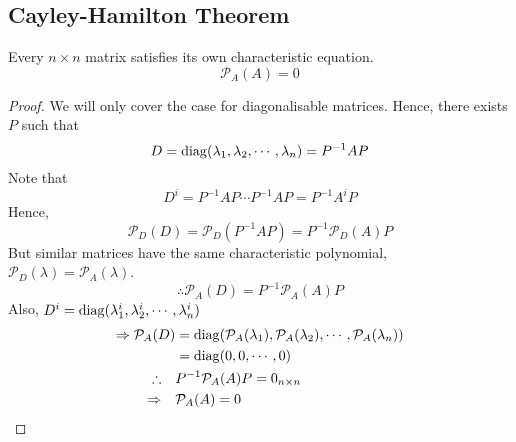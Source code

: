 \documentclass{article}
\numberwithin{equation}{section}
\begin{document}
\subsection{Cayley-Hamilton Theorem}
\begin{thm}
    Every $n \times n$ matrix satisfies its own characteristic equation.
    \begin{equation}\label{eq:5-20}
        \mathcal{P}_A(A) = 0
    \end{equation}
\end{thm}
\begin{proof}
    We will only cover the case for diagonalisable matrices. Hence, there exists $P$ such that
    \[
        D = \operatorname{diag}(\lambda_1, \lambda_2, \cdots, \lambda_n) = P^{-1}AP
    \]
    Note that
    \[
        D^i = P^{-1}AP \cdots P^{-1}AP = P^{-1}A^iP
    \]
    Hence,
    \[
        \mathcal{P}_D(D) = \mathcal{P}_D(P^{-1}AP) = P^{-1}\mathcal{P}_D(A)P  
    \]
    But similar matrices have the same characteristic polynomial, $\mathcal{P}_D(\lambda) = \mathcal{P}_A(\lambda)$.
    \[
        \therefore \mathcal{P}_A(D) = P^{-1}\mathcal{P}_A(A)P  
    \]
    Also, $D^i = \operatorname{diag}(\lambda_1^i, \lambda_2^i, \cdots, \lambda_n^i)$
    \begin{align*}
        \Rightarrow \mathcal{P}_A(D) &= \operatorname{diag}(\mathcal{P}_A(\lambda_1), \mathcal{P}_A(\lambda_2), \cdots, \mathcal{P}_A(\lambda_n)) \\
        &= \operatorname{diag}(0, 0, \cdots, 0) \\
        \therefore \quad& P^{-1}\mathcal{P}_A(A)P = 0_{n \times n} \\
        \Rightarrow \quad& \mathcal{P}_A(A) = 0
    \end{align*}
\end{proof}
\end{document}
